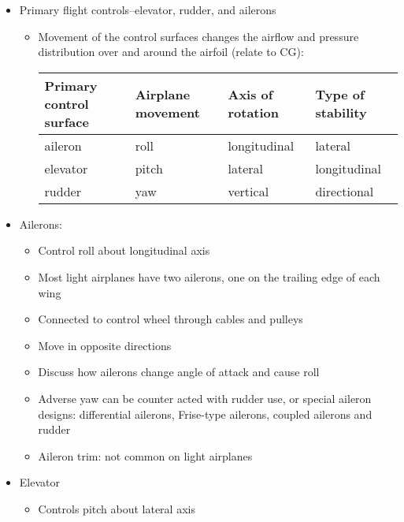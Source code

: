 \begin{itemize}
  \item Primary flight controls--elevator, rudder, and ailerons
    \begin{itemize}
      \item Movement of the control surfaces changes the airflow and pressure
        distribution over and around the airfoil (relate to CG):
\begin{table}[h]
\centering
\begin{tabular}{l|l|l|l}
Primary control surface & Airplane movement & Axis of rotation & Type of stability \\\hline
aileron                 & roll              & longitudinal     & lateral           \\
elevator                & pitch             & lateral          & longitudinal      \\
rudder                  & yaw               & vertical         & directional
\end{tabular}
\end{table}
    \end{itemize}
  \item Ailerons:
    \begin{itemize}
      \item Control roll about longitudinal axis

      \item Most light airplanes have two ailerons, one on the trailing edge of
        each wing

      \item Connected to control wheel through cables and pulleys

      \item Move in opposite directions

      \item Discuss how ailerons change angle of attack and cause roll

      \item Adverse yaw can be counter acted with rudder use, or special
        aileron designs: differential ailerons, Frise-type ailerons, coupled
        ailerons and rudder

      \item Aileron trim: not common on light airplanes
    \end{itemize}
  \item Elevator
    \begin{itemize}
      \item Controls pitch about lateral axis


\end{itemize}
\end{itemize}
